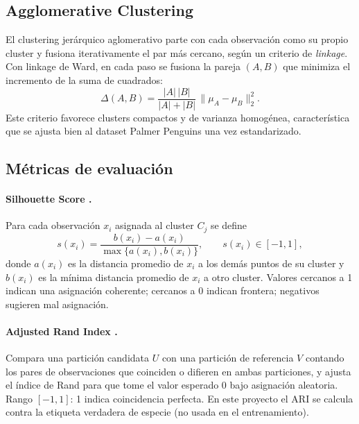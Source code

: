 \subsection{Agglomerative Clustering}

El clustering jerárquico aglomerativo \citep{ward1963hierarchical,murtagh1983survey} parte con cada observación como su propio cluster y fusiona iterativamente el par más cercano, según un criterio de \emph{linkage}. Con linkage de Ward, en cada paso se fusiona la pareja $(A,B)$ que minimiza el incremento de la suma de cuadrados:
\begin{equation}
\Delta(A,B) = \frac{|A|\,|B|}{|A|+|B|}\,\|\mu_A - \mu_B\|_2^2 .
\label{eq:ward}
\end{equation}
Este criterio favorece clusters compactos y de varianza homogénea, característica que se ajusta bien al dataset Palmer Penguins una vez estandarizado.

\subsection{Métricas de evaluación}

\paragraph{Silhouette Score \citep{rousseeuw1987silhouettes}.}
Para cada observación $x_i$ asignada al cluster $C_j$ se define
\begin{equation}
s(x_i) = \frac{b(x_i) - a(x_i)}{\max\{a(x_i), b(x_i)\}}, \qquad s(x_i)\in[-1,1],
\label{eq:silhouette}
\end{equation}
donde $a(x_i)$ es la distancia promedio de $x_i$ a los demás puntos de su cluster y $b(x_i)$ es la mínima distancia promedio de $x_i$ a otro cluster. Valores cercanos a 1 indican una asignación coherente; cercanos a 0 indican frontera; negativos sugieren mal asignación.

\paragraph{Adjusted Rand Index \citep{rand1971objective,hubert1985comparing}.}
Compara una partición candidata $U$ con una partición de referencia $V$ contando los pares de observaciones que coinciden o difieren en ambas particiones, y ajusta el índice de Rand para que tome el valor esperado 0 bajo asignación aleatoria. Rango $[-1,1]$: 1 indica coincidencia perfecta. En este proyecto el ARI se calcula contra la etiqueta verdadera de especie (no usada en el entrenamiento).

